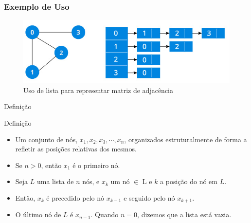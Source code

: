 \begin{frame}
\frametitle{Exemplo de Uso}
\begin{figure}[!hb]
	\centering
		\includegraphics[height=0.30\paperheight, width=0.55\paperwidth]{figs/fig_listas/lista_matriz_adjacencia}			
			\caption{Uso de lista para representar matriz de adjacência}	
			\end{figure} 

  \end{frame}



\begin{frame}{Definição}
     \begin{block}{Definição}
     \begin{itemize}
       \item Um conjunto de nós, $x_1, x_2, x_3, \cdots, x_n$, organizados estruturalmente de forma a refletir as posições relativas dos mesmos. 
       \item  Se $n > 0$, então $x_1$ é o primeiro nó.
      \item Seja $L$ uma lista de $n$ nós, e $x_k$ um nó $\in$ L e $k$ a posição do nó em $L$. 
      \item  Então, $x_k$ é precedido pelo nó $x_{k-1}$ e seguido pelo nó $x_{k+1}$. 
      \item  O último nó de $L$ é $x_{n-1}$. Quando $n = 0$, dizemos que a lista está vazia.
       \end{itemize}
     \end{block}     
\end{frame}



